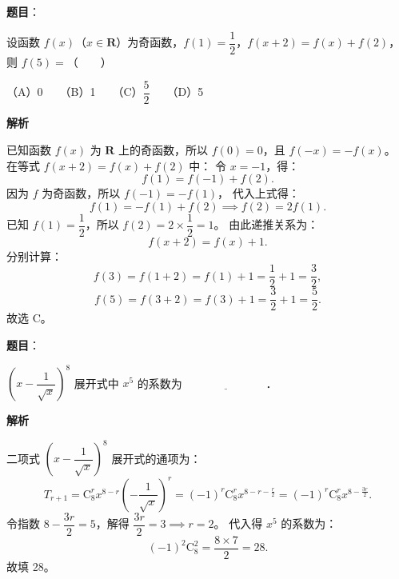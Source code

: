 \begin{answer}

\textbf{题目}：

设函数 $f(x)$（$x\in\mathbf{R}$）为奇函数，$f(1)=\dfrac{1}{2}$，$f(x+2)=f(x)+f(2)$，则 $f(5)=$\mbox{（　　）}

（A）0　　（B）1　　（C）$\dfrac{5}{2}$　　（D）5

\textbf{解析}

已知函数 $f(x)$ 为 $\mathbf{R}$ 上的奇函数，所以 $f(0)=0$，且 $f(-x)=-f(x)$。
在等式 $f(x+2)=f(x)+f(2)$ 中：
令 $x=-1$，得：
\nopagebreak[4]
\[
f(1)=f(-1)+f(2).
\]
因为 $f$ 为奇函数，所以 $f(-1)=-f(1)$，
代入上式得：
\nopagebreak[4]
\[
f(1)=-f(1)+f(2)\implies f(2)=2f(1).
\]
已知 $f(1)=\dfrac{1}{2}$，所以 $f(2)=2\times\dfrac{1}{2}=1$。
由此递推关系为：
\nopagebreak[4]
\[
f(x+2)=f(x)+1.
\]
分别计算：
\nopagebreak[4]
\[
f(3)=f(1+2)=f(1)+1=\frac{1}{2}+1=\frac{3}{2},
\]
\nopagebreak[4]
\[
f(5)=f(3+2)=f(3)+1=\frac{3}{2}+1=\frac{5}{2}.
\]
故选 C。


\end{answer}
\begin{answer}

\textbf{题目}：

$\left(x-\dfrac{1}{\sqrt{x}}\right)^8$ 展开式中 $x^5$ 的系数为 $\underline{\hspace{3cm}}$．

\textbf{解析}

二项式 $\left(x-\dfrac{1}{\sqrt{x}}\right)^8$ 展开式的通项为：
\nopagebreak[4]
\[
T_{r+1}=\mathrm{C}_8^r x^{8-r}\left(-\frac{1}{\sqrt{x}}\right)^r=(-1)^r\mathrm{C}_8^r x^{8-r-\frac{r}{2}}=(-1)^r\mathrm{C}_8^r x^{8-\frac{3r}{2}}.
\]
令指数 $8-\dfrac{3r}{2}=5$，解得 $\dfrac{3r}{2}=3\implies r=2$。
代入得 $x^5$ 的系数为：
\nopagebreak[4]
\[
(-1)^2\mathrm{C}_8^2=\frac{8\times 7}{2}=28.
\]
故填 28。


\end{answer}
